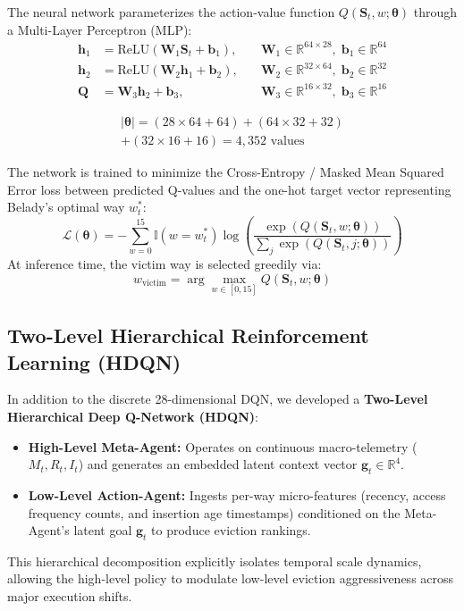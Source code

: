 \documentclass[conference]{IEEEtran}
\begin{document}
The neural network parameterizes the action-value function $Q(\mathbf{S}_t, w; \boldsymbol{\theta})$ through a Multi-Layer Perceptron (MLP):
\begin{align}
    \mathbf{h}_1 &= \text{ReLU}(\mathbf{W}_1 \mathbf{S}_t + \mathbf{b}_1), \quad &\mathbf{W}_1 \in \mathbb{R}^{64 \times 28}, \; \mathbf{b}_1 \in \mathbb{R}^{64} \\
    \mathbf{h}_2 &= \text{ReLU}(\mathbf{W}_2 \mathbf{h}_1 + \mathbf{b}_2), \quad &\mathbf{W}_2 \in \mathbb{R}^{32 \times 64}, \; \mathbf{b}_2 \in \mathbb{R}^{32} \\
    \mathbf{Q} &= \mathbf{W}_3 \mathbf{h}_2 + \mathbf{b}_3, \quad &\mathbf{W}_3 \in \mathbb{R}^{16 \times 32}, \; \mathbf{b}_3 \in \mathbb{R}^{16}
\end{align}

\begin{multline}
    |\boldsymbol{\theta}| = (28 \times 64 + 64) + (64 \times 32 + 32) \\
    + (32 \times 16 + 16) = 4,352 \text{ values}
\end{multline}

The network is trained to minimize the Cross-Entropy / Masked Mean Squared Error loss between predicted Q-values and the one-hot target vector representing Belady's optimal way $w^*_t$:
\begin{equation}
    \mathcal{L}(\boldsymbol{\theta}) = -\sum_{w=0}^{15} \mathbb{I}(w = w^*_t) \log \left( \frac{\exp(Q(\mathbf{S}_t, w; \boldsymbol{\theta}))}{\sum_{j} \exp(Q(\mathbf{S}_t, j; \boldsymbol{\theta}))} \right)
\end{equation}
At inference time, the victim way is selected greedily via:
\begin{equation}
    w_{\text{victim}} = \arg\max_{w \in [0, 15]} Q(\mathbf{S}_t, w; \boldsymbol{\theta})
\end{equation}

\subsection{Two-Level Hierarchical Reinforcement Learning (HDQN)}
In addition to the discrete 28-dimensional DQN, we developed a \textbf{Two-Level Hierarchical Deep Q-Network (HDQN)}:
\begin{itemize}
    \item \textbf{High-Level Meta-Agent:} Operates on continuous macro-telemetry ($M_t, R_t, I_t$) and generates an embedded latent context vector $\mathbf{g}_t \in \mathbb{R}^4$.
    \item \textbf{Low-Level Action-Agent:} Ingests per-way micro-features (recency, access frequency counts, and insertion age timestamps) conditioned on the Meta-Agent's latent goal $\mathbf{g}_t$ to produce eviction rankings.
\end{itemize}
This hierarchical decomposition explicitly isolates temporal scale dynamics, allowing the high-level policy to modulate low-level eviction aggressiveness across major execution shifts.
\end{document}
